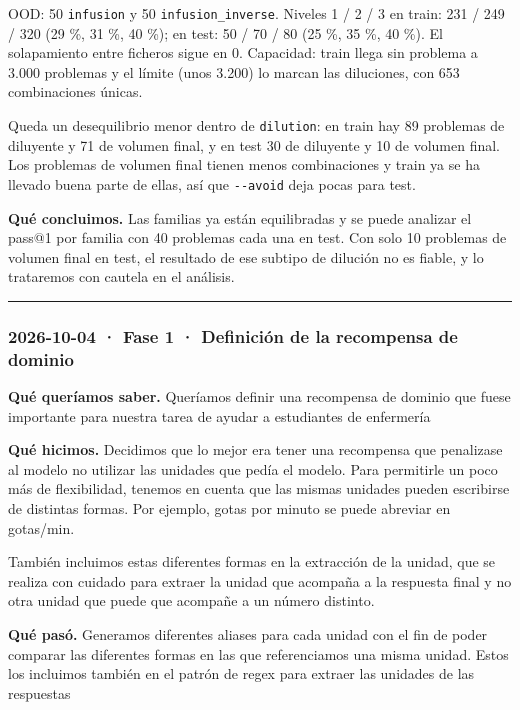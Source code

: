 OOD: 50 \texttt{infusion} y 50 \texttt{infusion\_\allowbreak{}inverse}. Niveles 1 / 2 / 3 en train: 231 / 249 / 320 (29 \%,
31 \%, 40 \%); en test: 50 / 70 / 80 (25 \%, 35 \%, 40 \%). El solapamiento entre ficheros sigue en
0. Capacidad: train llega sin problema a 3.000 problemas y el límite (unos 3.200) lo marcan las
diluciones, con 653 combinaciones únicas.

Queda un desequilibrio menor dentro de \texttt{dilution}: en train hay 89 problemas de diluyente y 71
de volumen final, y en test 30 de diluyente y 10 de volumen final. Los problemas de volumen
final tienen menos combinaciones y train ya se ha llevado buena parte de ellas, así que
\texttt{-\/\allowbreak{}-avoid} deja pocas para test.

\textbf{Qué concluimos.} Las familias ya están equilibradas y se puede analizar el pass@1 por
familia con 40 problemas cada una en test. Con solo 10 problemas de volumen final en test, el
resultado de ese subtipo de dilución no es fiable, y lo trataremos con cautela en el análisis.

\begin{center}\rule{0.5\linewidth}{0.5pt}\end{center}

\subsubsection{2026-10-04 · Fase 1 · Definición de la recompensa de dominio}

\textbf{Qué queríamos saber.} Queríamos definir una recompensa de dominio que fuese importante para nuestra tarea de ayudar a estudiantes de enfermería

\textbf{Qué hicimos.} Decidimos que lo mejor era tener una recompensa que penalizase al modelo no utilizar las unidades que pedía el modelo. Para permitirle un poco más de flexibilidad, tenemos en cuenta que las mismas unidades pueden escribirse de distintas formas. Por ejemplo, gotas por minuto se puede abreviar en gotas/min.

También incluimos estas diferentes formas en la extracción de la unidad, que se realiza con cuidado para extraer la unidad que acompaña a la respuesta final y no otra unidad que puede que acompañe a un número distinto.

\textbf{Qué pasó.} Generamos diferentes aliases para cada unidad con el fin de poder comparar las diferentes formas en las que referenciamos una misma unidad. Estos los incluimos también en el patrón de regex para extraer las unidades de las respuestas

